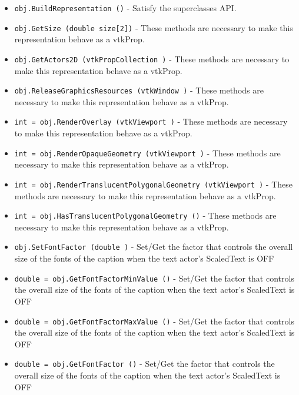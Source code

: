 \begin{itemize}
\item  \verb|obj.BuildRepresentation ()| -  Satisfy the superclasses API.

\item  \verb|obj.GetSize (double size[2])| -  These methods are necessary to make this representation behave as
 a vtkProp.

\item  \verb|obj.GetActors2D (vtkPropCollection )| -  These methods are necessary to make this representation behave as
 a vtkProp.

\item  \verb|obj.ReleaseGraphicsResources (vtkWindow )| -  These methods are necessary to make this representation behave as
 a vtkProp.

\item  \verb|int = obj.RenderOverlay (vtkViewport )| -  These methods are necessary to make this representation behave as
 a vtkProp.

\item  \verb|int = obj.RenderOpaqueGeometry (vtkViewport )| -  These methods are necessary to make this representation behave as
 a vtkProp.

\item  \verb|int = obj.RenderTranslucentPolygonalGeometry (vtkViewport )| -  These methods are necessary to make this representation behave as
 a vtkProp.

\item  \verb|int = obj.HasTranslucentPolygonalGeometry ()| -  These methods are necessary to make this representation behave as
 a vtkProp.

\item  \verb|obj.SetFontFactor (double )| -  Set/Get the factor that controls the overall size of the fonts 
 of the caption when the text actor's ScaledText is OFF 

\item  \verb|double = obj.GetFontFactorMinValue ()| -  Set/Get the factor that controls the overall size of the fonts 
 of the caption when the text actor's ScaledText is OFF 

\item  \verb|double = obj.GetFontFactorMaxValue ()| -  Set/Get the factor that controls the overall size of the fonts 
 of the caption when the text actor's ScaledText is OFF 

\item  \verb|double = obj.GetFontFactor ()| -  Set/Get the factor that controls the overall size of the fonts 
 of the caption when the text actor's ScaledText is OFF 

\end{itemize}
